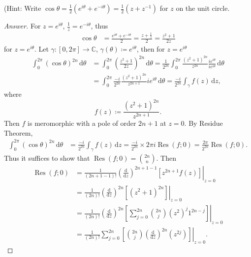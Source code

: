 \documentclass[12pt]{article}
\newcommand{\cx}{\mathbb{C}}
\newcommand\inv[1]{#1^{-1}}
\newcommand\paren[1]{\left( #1 \right)}
\newcommand{\sqbrack}[1]{\left [ #1 \right ]}
\theoremstyle{definition}
\DeclareMathOperator\Res{Res}
\begin{document}
(Hint: Write $\cos \theta = \frac{1}{2} \paren{ e^{i\theta} + e^{-i\theta} } = \frac{1}{2} \paren{ z + \inv{z} }$ for $z$ on the unit circle.
\begin{proof}[Answer]
    For $z = e^{i\theta}$, $\frac{1}{z} = e^{-i\theta}$, thus 
    \begin{align*}
        \cos \theta & = \frac{e^{i\theta}+e^{-i\theta}}{2} = \frac{z + \frac{1}{z}}{2} = \frac{z^2+1}{2z}
    \end{align*}
    for $z = e^{i\theta}$. Let $\gamma : [0,2\pi] \to \cx$, $\gamma(\theta) \coloneqq e^{i\theta}$, then for $z = e^{i\theta}$
    \begin{align*}
        \int_0^{2\pi} \paren{ \cos \theta }^{2n} \, \mathrm{d}\theta & = \int_0^{2\pi} \paren{ \frac{z^2+1}{2z} }^{2n} \, \mathrm{d}\theta = \frac{1}{2^{2n}} \int_0^{2\pi}  \frac{\paren{z^2+1}^{2n}}{z^{2n}}  \frac{i e^{i\theta}}{i e^{i\theta}} \, \mathrm{d}\theta \\
        & = \int_0^{2\pi} \frac{-i}{2^{2n}} \frac{\paren{z^2+1}^{2n}}{z^{2n+1}} i e^{i\theta} \, \mathrm{d}\theta = \frac{-i}{2^{2n}} \int_{\gamma} f(z) \, \mathrm{d}z,
    \end{align*}
    where 
    \[
        f(z) \coloneqq \frac{\paren{z^2+1}^{2n}}{z^{2n+1}}.
    \]
    Then $f$ is meromorphic with a pole of order $2n +1$ at $z = 0$. By Residue Theorem,
    \begin{align*}
        \int_0^{2\pi} \paren{ \cos \theta }^{2n} \, \mathrm{d}\theta & = \frac{-i}{2^{2n}} \int_{\gamma} f(z) \, \mathrm{d}z = \frac{-i}{2^{2n}} \times 2\pi i \Res(f;0) = \frac{2\pi}{2^{2n}} \Res(f;0).
    \end{align*}
    Thus it suffices to show that $\Res(f;0) = \binom{2n}{n}$. Then
    \begin{align*}
        \Res(f;0) & = \left. \frac{1}{(2n+1-1)!} \paren{ \frac{\mathrm{d}}{\mathrm{d}z} }^{2n+1-1} \sqbrack{ z^{2n+1} f(z) } \right|_{z = 0} \\
        & = \left. \frac{1}{(2n)!} \paren{ \frac{\mathrm{d}}{\mathrm{d}z} }^{2n} \sqbrack{ \paren{ z^2 + 1 }^{2n} } \right|_{z=0} \\
        & = \left. \frac{1}{(2n)!} \paren{ \frac{\mathrm{d}}{\mathrm{d}z} }^{2n} \sqbrack{ \sum\limits_{j = 0}^{2n} \binom{2n}{j} \paren{z^2}^{j} 1^{2n-j} } \right|_{z=0} \\
        & = \left. \frac{1}{(2n)!} \sum\limits_{j = 0}^{2n} \sqbrack{ \binom{2n}{j} \paren{ \frac{\mathrm{d}}{\mathrm{d}z} }^{2n}  \paren{z^{2j}} } \right|_{z=0}.
    \end{align*}

\end{proof}
\end{document}
